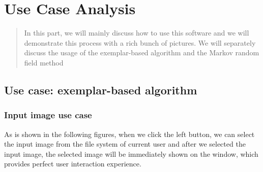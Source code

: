 \chapter{Use Case Analysis}
\begin{abstract}
In this part, we will mainly discuss how to use this software and we will demonstrate this process with a rich bunch of pictures. We will separately discuss the usage of the exemplar-based algorithm and the Markov random field method
\end{abstract}

\section{Use case: exemplar-based algorithm}
\subsection{Input image use case}
As is shown in the following figures, when we click the left button, we can select the input image from the file system of current user and after we selected the input image, the selected image will be immediately shown on the window, which provides perfect user interaction experience.

